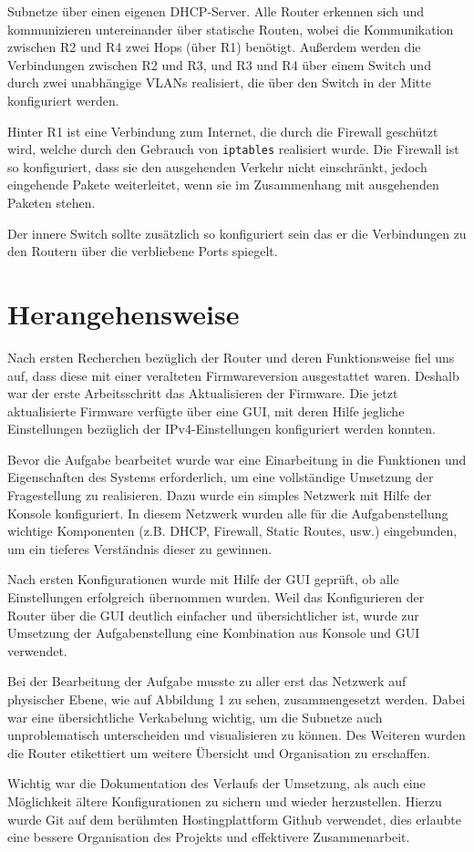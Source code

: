 \documentclass[11pt,a4paper]{article}
\begin{document}
Subnetze über einen eigenen DHCP-Server. Alle Router erkennen sich und
kommunizieren untereinander über statische Routen, wobei die
Kommunikation zwischen R2 und R4 zwei Hops (über R1) benötigt.
Außerdem werden die Verbindungen zwischen R2 und R3, und R3 und R4
über einem Switch und durch zwei unabhängige VLANs realisiert, die
über den Switch in der Mitte konfiguriert werden.
\par
Hinter R1 ist eine Verbindung zum Internet, die durch die Firewall
geschützt wird, welche durch den Gebrauch von \texttt{iptables}
realisiert wurde. Die Firewall ist so konfiguriert, dass sie den
ausgehenden Verkehr nicht einschränkt, jedoch eingehende Pakete
weiterleitet, wenn sie im Zusammenhang mit ausgehenden Paketen stehen.
\par
Der innere Switch sollte zusätzlich so konfiguriert sein das er die
Verbindungen zu den Routern über die verbliebene Ports spiegelt.

\section{Herangehensweise}
Nach ersten Recherchen bezüglich der Router und deren Funktionsweise
fiel uns auf, dass diese mit einer veralteten Firmwareversion
ausgestattet waren. Deshalb war der erste Arbeitsschritt das
Aktualisieren der Firmware. Die jetzt aktualisierte Firmware verfügte
über eine GUI, mit deren Hilfe jegliche Einstellungen bezüglich der
IPv4-Einstellungen konfiguriert werden konnten.
\par
Bevor die Aufgabe bearbeitet wurde war eine Einarbeitung in die
Funktionen und Eigenschaften des Systems erforderlich, um eine
vollständige Umsetzung der Fragestellung zu realisieren. Dazu wurde
ein simples Netzwerk mit Hilfe der Konsole konfiguriert. In diesem
Netzwerk wurden alle für die Aufgabenstellung wichtige
Komponenten (z.B. DHCP, Firewall, Static Routes, usw.) eingebunden, um
ein tieferes Verständnis dieser zu gewinnen.
\par
Nach ersten Konfigurationen wurde mit Hilfe der GUI geprüft, ob alle
Einstellungen erfolgreich übernommen wurden. Weil das Konfigurieren
der Router über die GUI deutlich einfacher und übersichtlicher ist,
wurde zur Umsetzung der Aufgabenstellung eine Kombination aus Konsole
und GUI verwendet.
\par
Bei der Bearbeitung der Aufgabe musste zu aller erst das Netzwerk auf
physischer Ebene, wie auf Abbildung 1 zu sehen, zusammengesetzt
werden. Dabei war eine übersichtliche Verkabelung wichtig, um die
Subnetze auch unproblematisch unterscheiden und visualisieren zu
können. Des Weiteren wurden die Router etikettiert um weitere
Übersicht und Organisation zu erschaffen.
\par
Wichtig war die Dokumentation des Verlaufs der Umsetzung, als auch
eine Möglichkeit ältere Konfigurationen zu sichern und wieder
herzustellen. Hierzu wurde Git auf dem berühmten Hostingplattform
Github verwendet, dies erlaubte eine bessere Organisation des Projekts
und effektivere Zusammenarbeit.
\end{document}
